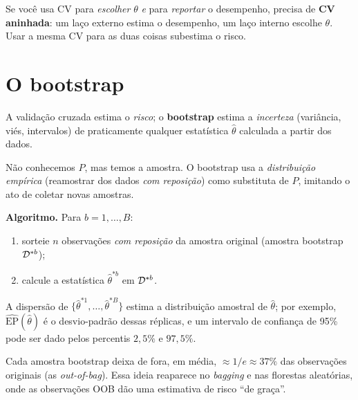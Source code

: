 \documentclass[11pt,a4paper]{article}
\begin{document}
\begin{atencao}
Se você usa CV para \emph{escolher} $\theta$ \emph{e} para \emph{reportar} o
desempenho, precisa de \textbf{CV aninhada}: um laço externo estima o desempenho,
um laço interno escolhe $\theta$. Usar a mesma CV para as duas coisas subestima o
risco.
\end{atencao}

\section{O bootstrap}
A validação cruzada estima o \emph{risco}; o \textbf{bootstrap} estima a
\emph{incerteza} (variância, viés, intervalos) de praticamente qualquer
estatística $\widehat\theta$ calculada a partir dos dados.

\begin{ideia}
Não conhecemos $P$, mas temos a amostra. O bootstrap usa a \emph{distribuição
empírica} (reamostrar dos dados \emph{com reposição}) como substituta de $P$,
imitando o ato de coletar novas amostras.
\end{ideia}

\noindent\textbf{Algoritmo.} Para $b=1,\dots,B$:
\begin{enumerate}[leftmargin=1.6cm,nosep]
  \item sorteie $n$ observações \emph{com reposição} da amostra original (amostra
        bootstrap $\mathcal{D}^{*b}$);
  \item calcule a estatística $\widehat\theta^{*b}$ em $\mathcal{D}^{*b}$.
\end{enumerate}
A dispersão de $\{\widehat\theta^{*1},\dots,\widehat\theta^{*B}\}$ estima a
distribuição amostral de $\widehat\theta$; por exemplo,
$\widehat{\mathrm{EP}}(\widehat\theta)$ é o desvio-padrão dessas réplicas, e um
intervalo de confiança de 95\% pode ser dado pelos percentis $2{,}5\%$ e $97{,}5\%$.

\begin{observacao}
Cada amostra bootstrap deixa de fora, em média, $\approx 1/e \approx 37\%$ das
observações originais (as \emph{out-of-bag}). Essa ideia reaparece no
\emph{bagging} e nas florestas aleatórias, onde as observações OOB dão
uma estimativa de risco ``de graça''.
\end{observacao}

\end{document}
